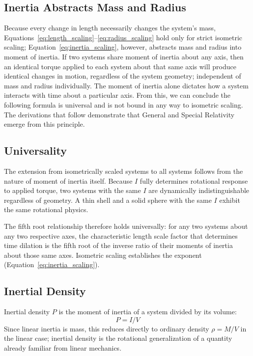 \subsection{Inertia Abstracts Mass and Radius}
Because every change in length necessarily changes the system's mass, Equations~\ref{eq:length_scaling}--\ref{eq:radius_scaling} hold only for strict isometric scaling; Equation~\ref{eq:inertia_scaling}, however, abstracts mass and radius into moment of inertia. If two systems share moment of inertia about any axis, then an identical torque applied to each system about that same axis will produce identical changes in motion, regardless of the system geometry; independent of mass and radius individually. The moment of inertia alone dictates how a system interacts with time about a particular axis. From this, we can conclude the following formula is universal and is not bound in any way to isometric scaling. The derivations that follow demonstrate that General and Special Relativity emerge from this principle.

\subsection{Universality}
The extension from isometrically scaled systems to all systems follows from the nature of moment of inertia itself. Because $I$ fully determines rotational response to applied torque, two systems with the same $I$ are dynamically indistinguishable regardless of geometry. A thin shell and a solid sphere with the same $I$ exhibit the same rotational physics.

The fifth root relationship therefore holds universally: for any two systems about any two respective axes, the characteristic length scale factor that determines time dilation is the fifth root of the inverse ratio of their moments of inertia about those same axes. Isometric scaling establishes the exponent (Equation~\ref{eq:inertia_scaling}).

\subsection{Inertial Density}

Inertial density $P$ is the moment of inertia of a system divided by its volume:
\begin{equation}
P = I/V
\end{equation}
Since linear inertia is mass, this reduces directly to ordinary density $\rho = M/V$ in the linear case; inertial density is the rotational generalization of a quantity already familiar from linear mechanics.

